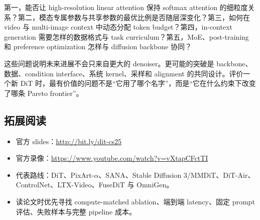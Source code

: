 \documentclass[a4paper]{article}
\begin{document}
第一，能否让 high-resolution linear attention 保持 softmax attention 的细粒度关系？第二，模态专属参数与共享参数的最优比例是否随层深变化？第三，如何在 video 与 multi-image context 中动态分配 token budget？第四，in-context generation 需要怎样的数据格式与 task curriculum？第五，MoE、post-training 和 preference optimization 怎样与 diffusion backbone 协同？

这些问题说明未来进展不会只来自更大的 denoiser。更可能的突破是 backbone、数据、condition interface、系统 kernel、采样和 alignment 的共同设计。评价一个新 DiT 时，最有价值的问题不是“它用了哪个名字”，而是“它在什么约束下改变了哪条 Pareto frontier”。

\subsection{拓展阅读}

\begin{itemize}[itemsep=0.2em,topsep=0.2em]
  \item 官方 slides：\url{http://bit.ly/dit-cs25}
  \item 官方录像：\url{https://www.youtube.com/watch?v=vXtapCFctTI}
  \item 代表路线：DiT、PixArt-$\alpha$、SANA、Stable Diffusion 3/MMDiT、DiT-Air、ControlNet、LTX-Video、FuseDiT 与 OmniGen。
  \item 读论文时优先寻找 compute-matched ablation、端到端 latency、固定 prompt 评估、失败样本与完整 pipeline 成本。
\end{itemize}
\end{document}
